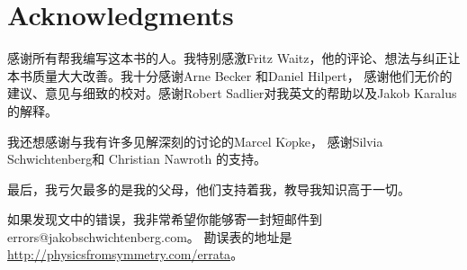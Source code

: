 
\chapter*{Acknowledgments}
感谢所有帮我编写这本书的人。我特别感激Fritz Waitz，他的评论、想法与纠正让本书质量大大改善。我十分感谢Arne Becker 和Daniel Hilpert， 感谢他们无价的建议、意见与细致的校对。感谢Robert Sadlier对我英文的帮助以及Jakob Karalus的解释。

我还想感谢与我有许多见解深刻的讨论的Marcel K$\ddot{o}$pke， 感谢Silvia Schwichtenberg和 Christian Nawroth 的支持。

最后，我亏欠最多的是我的父母，他们支持着我，教导我知识高于一切。

如果发现文中的错误，我非常希望你能够寄一封短邮件到 errors@jakobschwichtenberg.com。 勘误表的地址是\url{http://physicsfromsymmetry.com/errata}。
